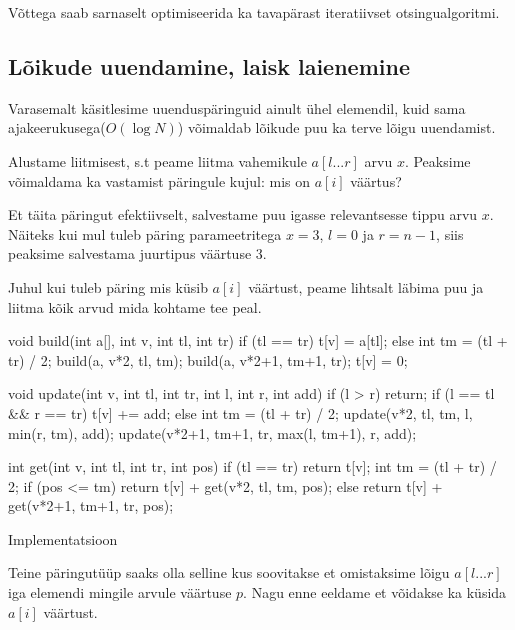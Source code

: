 \documentclass{trkut}
\begin{document}
Võttega saab sarnaselt optimiseerida ka tavapärast iteratiivset otsingualgoritmi. \parencite{brown}

\subsection{Lõikude uuendamine, laisk laienemine}

Varasemalt käsitlesime uuenduspäringuid ainult ühel elemendil, kuid sama ajakeerukusega($O(\log N)$) võimaldab lõikude puu ka terve lõigu uuendamist. \parencite{EMaxx}

Alustame liitmisest, s.t peame liitma vahemikule $a[l...r]$ arvu $x$. Peaksime võimaldama ka vastamist päringule kujul: mis on $a[i]$ väärtus?

Et täita päringut efektiivselt, salvestame puu igasse relevantsesse tippu arvu $x$. Näiteks kui mul tuleb päring parameetritega $x=3$, $l=0$ ja $r=n-1$, siis peaksime salvestama juurtipus väärtuse $3$. \parencite{EMaxx}

Juhul kui tuleb päring mis küsib $a[i]$ väärtust, peame lihtsalt läbima puu ja liitma kõik arvud mida kohtame tee peal. \parencite{EMaxx}
\begin{cclol}
void build(int a[], int v, int tl, int tr) {
    if (tl == tr) {
        t[v] = a[tl];
    } else {
        int tm = (tl + tr) / 2;
        build(a, v*2, tl, tm);
        build(a, v*2+1, tm+1, tr);
        t[v] = 0;
    }
}

void update(int v, int tl, int tr, int l, int r, int add) {
    if (l > r)
        return;
    if (l == tl && r == tr) {
        t[v] += add;
    } else {
        int tm = (tl + tr) / 2;
        update(v*2, tl, tm, l, min(r, tm), add);
        update(v*2+1, tm+1, tr, max(l, tm+1), r, add);
    }
}

int get(int v, int tl, int tr, int pos) {
    if (tl == tr)
        return t[v];
    int tm = (tl + tr) / 2;
    if (pos <= tm)
        return t[v] + get(v*2, tl, tm, pos);
    else
        return t[v] + get(v*2+1, tm+1, tr, pos);
}
\end{cclol}
 \begin{kk}[H]%
    \caption{Implementatsioon}%
    \label{EMaxx}%
    \end{kk}
Teine päringutüüp saaks olla selline kus soovitakse et omistaksime lõigu $a[l...r]$ iga elemendi mingile arvule väärtuse $p$. Nagu enne eeldame et võidakse ka küsida $a[i]$ väärtust. 
\end{document}

